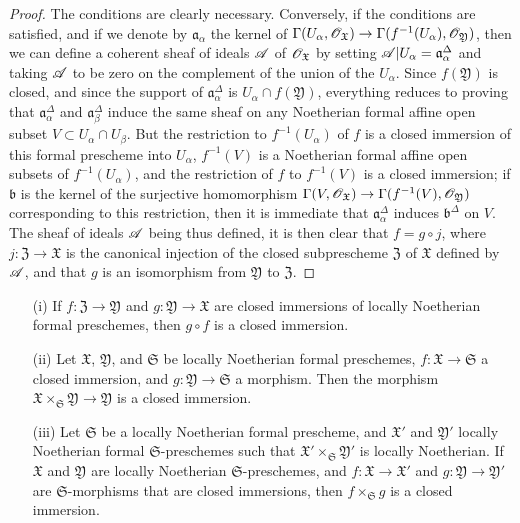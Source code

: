 \begin{proof}
\label{proof-1.10.14.4}
The conditions are clearly necessary.
Conversely, if the conditions are satisfied, and if we denote by $\mathfrak{a}_\alpha$ the kernel of $\Gamma(U_\alpha,\sh{O}_\mathfrak{X})\to\Gamma(f^{-1}(U_\alpha),\sh{O}_\mathfrak{Y})$, then we can define a coherent sheaf of ideals $\mathscr{A}$ of $\mathscr{O}_\mathfrak{X}$ by setting $\mathscr{A}|U_\alpha=\mathfrak{a}_\alpha^\Delta$ and taking $\mathscr{A}$ to be zero on the complement of the union of the $U_\alpha$.
Since $f(\mathfrak{Y})$ is closed, and since the support of $\mathfrak{a}_\alpha^\Delta$ is $U_\alpha\cap f(\mathfrak{Y})$, everything reduces to proving that $\mathfrak{a}_\alpha^\Delta$ and $\mathfrak{a}_\beta^\Delta$ induce the same sheaf on any Noetherian formal affine open subset $V\subset U_\alpha\cap U_\beta$.
But the restriction to $f^{-1}(U_\alpha)$ of $f$ is a closed immersion of this formal prescheme into $U_\alpha$, $f^{-1}(V)$ is a Noetherian formal affine open subsets of $f^{-1}(U_\alpha)$, and the restriction of $f$ to $f^{-1}(V)$ is a closed immersion;
if $\mathfrak{b}$ is the kernel of the surjective homomorphism $\Gamma(V,\sh{O}_\mathfrak{X})\to\Gamma(f^{-1}(V),\sh{O}_\mathfrak{Y})$ corresponding to this restriction, then it is immediate  that $\mathfrak{a}_\alpha^\Delta$ induces $\mathfrak{b}^\Delta$ on $V$.
The sheaf of ideals $\mathscr{A}$ being thus defined, it is then clear that $f=g\circ j$, where $j:\mathfrak{Z}\to\mathfrak{X}$ is the canonical injection of the closed subprescheme $\mathfrak{Z}$ of $\mathfrak{X}$ defined by $\mathscr{A}$, and that $g$ is an isomorphism from $\mathfrak{Y}$ to $\mathfrak{Z}$.
\end{proof}

\begin{proposition}[10.14.5]
\label{1.10.14.5}
\medskip\noindent
\begin{enumerate}
  \item[\rm{(i)}] If $f:\mathfrak{Z}\to\mathfrak{Y}$ and $g:\mathfrak{Y}\to\mathfrak{X}$ are closed immersions of locally Noetherian formal preschemes, then $g\circ f$ is a closed immersion.
  \item[\rm{(ii)}] Let $\mathfrak{X}$, $\mathfrak{Y}$, and $\mathfrak{S}$ be locally Noetherian formal preschemes, $f:\mathfrak{X}\to\mathfrak{S}$ a closed immersion, and $g:\mathfrak{Y}\to\mathfrak{S}$ a morphism.
    Then the morphism $\mathfrak{X}\times_\mathfrak{S}\mathfrak{Y}\to\mathfrak{Y}$ is a closed immersion.
  \item[\rm{(iii)}] Let $\mathfrak{S}$ be a locally Noetherian formal prescheme, and $\mathfrak{X}'$ and $\mathfrak{Y}'$ locally Noetherian formal $\mathfrak{S}$-preschemes such that $\mathfrak{X}'\times_\mathfrak{S}\mathfrak{Y}'$ is locally Noetherian.
    If $\mathfrak{X}$ and $\mathfrak{Y}$ are locally Noetherian $\mathfrak{S}$-preschemes, and $f:\mathfrak{X}\to\mathfrak{X}'$ and $g:\mathfrak{Y}\to\mathfrak{Y}'$ are $\mathfrak{S}$-morphisms that are closed immersions, then $f\times_\mathfrak{S}g$ is a closed immersion.
\end{enumerate}
\end{proposition}

